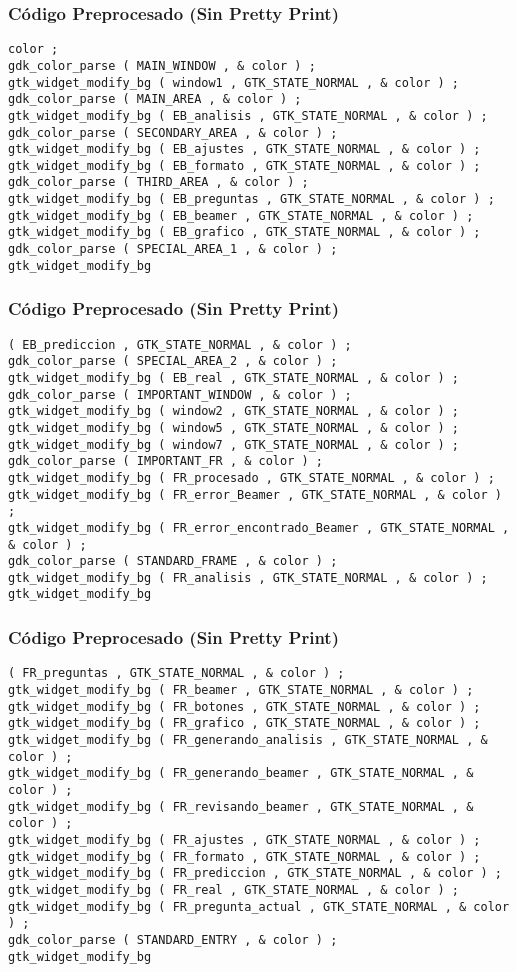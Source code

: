 \documentclass{beamer}
\begin{document}
\begin{frame}[fragile]
\frametitle{C\'odigo Preprocesado (Sin Pretty Print)}
\begin{lstlisting}[style=CStyle]
color ; 
gdk_color_parse ( MAIN_WINDOW , & color ) ; 
gtk_widget_modify_bg ( window1 , GTK_STATE_NORMAL , & color ) ; 
gdk_color_parse ( MAIN_AREA , & color ) ; 
gtk_widget_modify_bg ( EB_analisis , GTK_STATE_NORMAL , & color ) ; 
gdk_color_parse ( SECONDARY_AREA , & color ) ; 
gtk_widget_modify_bg ( EB_ajustes , GTK_STATE_NORMAL , & color ) ; 
gtk_widget_modify_bg ( EB_formato , GTK_STATE_NORMAL , & color ) ; 
gdk_color_parse ( THIRD_AREA , & color ) ; 
gtk_widget_modify_bg ( EB_preguntas , GTK_STATE_NORMAL , & color ) ; 
gtk_widget_modify_bg ( EB_beamer , GTK_STATE_NORMAL , & color ) ; 
gtk_widget_modify_bg ( EB_grafico , GTK_STATE_NORMAL , & color ) ; 
gdk_color_parse ( SPECIAL_AREA_1 , & color ) ; 
gtk_widget_modify_bg \end{lstlisting}
\end{frame}
\begin{frame}[fragile]
\frametitle{C\'odigo Preprocesado (Sin Pretty Print)}
\begin{lstlisting}[style=CStyle]
( EB_prediccion , GTK_STATE_NORMAL , & color ) ; 
gdk_color_parse ( SPECIAL_AREA_2 , & color ) ; 
gtk_widget_modify_bg ( EB_real , GTK_STATE_NORMAL , & color ) ; 
gdk_color_parse ( IMPORTANT_WINDOW , & color ) ; 
gtk_widget_modify_bg ( window2 , GTK_STATE_NORMAL , & color ) ; 
gtk_widget_modify_bg ( window5 , GTK_STATE_NORMAL , & color ) ; 
gtk_widget_modify_bg ( window7 , GTK_STATE_NORMAL , & color ) ; 
gdk_color_parse ( IMPORTANT_FR , & color ) ; 
gtk_widget_modify_bg ( FR_procesado , GTK_STATE_NORMAL , & color ) ; 
gtk_widget_modify_bg ( FR_error_Beamer , GTK_STATE_NORMAL , & color ) ; 
gtk_widget_modify_bg ( FR_error_encontrado_Beamer , GTK_STATE_NORMAL , & color ) ; 
gdk_color_parse ( STANDARD_FRAME , & color ) ; 
gtk_widget_modify_bg ( FR_analisis , GTK_STATE_NORMAL , & color ) ; 
gtk_widget_modify_bg \end{lstlisting}
\end{frame}
\begin{frame}[fragile]
\frametitle{C\'odigo Preprocesado (Sin Pretty Print)}
\begin{lstlisting}[style=CStyle]
( FR_preguntas , GTK_STATE_NORMAL , & color ) ; 
gtk_widget_modify_bg ( FR_beamer , GTK_STATE_NORMAL , & color ) ; 
gtk_widget_modify_bg ( FR_botones , GTK_STATE_NORMAL , & color ) ; 
gtk_widget_modify_bg ( FR_grafico , GTK_STATE_NORMAL , & color ) ; 
gtk_widget_modify_bg ( FR_generando_analisis , GTK_STATE_NORMAL , & color ) ; 
gtk_widget_modify_bg ( FR_generando_beamer , GTK_STATE_NORMAL , & color ) ; 
gtk_widget_modify_bg ( FR_revisando_beamer , GTK_STATE_NORMAL , & color ) ; 
gtk_widget_modify_bg ( FR_ajustes , GTK_STATE_NORMAL , & color ) ; 
gtk_widget_modify_bg ( FR_formato , GTK_STATE_NORMAL , & color ) ; 
gtk_widget_modify_bg ( FR_prediccion , GTK_STATE_NORMAL , & color ) ; 
gtk_widget_modify_bg ( FR_real , GTK_STATE_NORMAL , & color ) ; 
gtk_widget_modify_bg ( FR_pregunta_actual , GTK_STATE_NORMAL , & color ) ; 
gdk_color_parse ( STANDARD_ENTRY , & color ) ; 
gtk_widget_modify_bg \end{lstlisting}
\end{frame}
\end{document}
